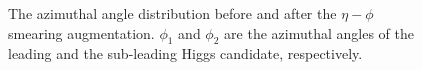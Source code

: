 \documentclass[12pt]{article}
\begin{document}
        \begin{figure}[htpb]
            \centering
            \caption{The azimuthal angle distribution before and after the $\eta-\phi$ smearing augmentation. $\phi_1$ and $\phi_2$ are the azimuthal angles of the leading and the sub-leading Higgs candidate, respectively.}
            \label{fig:eta_phi_smearing_phi_distribution}
        \end{figure}
\end{document}
